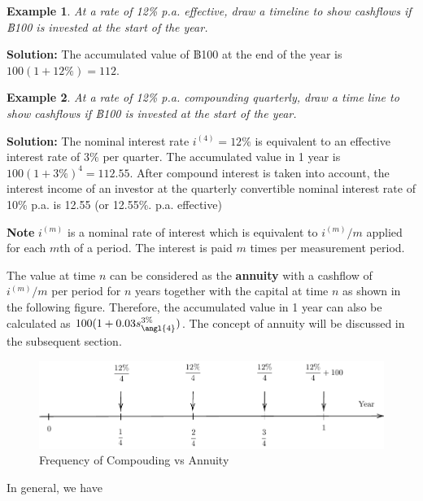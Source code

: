 \documentclass[
]{book}
\theoremstyle{definition}
\theoremstyle{definition}
\newtheorem{example}{Example}[chapter]
\theoremstyle{definition}
\theoremstyle{definition}
\theoremstyle{remark}
\begin{document}
\begin{example}
\emph{At a rate of 12\% p.a. effective, draw a timeline to show cashflows if
฿100 is invested at the start of the year.}
\end{example}

\textbf{Solution:} The accumulated value of ฿100 at the end of the year is
\(100 (1 + 12\%) = 112\).

\begin{example}
\emph{At a rate of 12\% p.a. compounding quarterly, draw a time line to show
cashflows if ฿100 is invested at the start of the year.}
\end{example}

\textbf{Solution:} The nominal interest rate \(i^{(4)} = 12\%\) is equivalent
to an effective interest rate of \(3\%\) per quarter. The accumulated
value in 1 year is \(100 (1 + 3\%)^4 = 112.55\). After compound interest
is taken into account, the interest income of an investor at the
quarterly convertible nominal interest rate of 10\% p.a. is 12.55 (or
12.55\%. p.a. effective)

\textbf{Note} \(i^{(m)}\) is a nominal rate of interest which is equivalent to \(i^{(m)}/m\) applied for
each \(m\)th of a period. The interest is paid \(m\) times per measurement period.

The value at time \(n\) can be considered as the \textbf{annuity} with a cashflow of \(i^{(m)}/m\) per period for \(n\) years together with the capital at time \(n\) as shown in the following figure.
Therefore, the accumulated value in 1 year can also be calculated as \(100( 1 + 0.03 s_{\angl{4}}^{3\%})\). The concept of annuity will be discussed in the subsequent section.

\begin{figure}

{\centering \includegraphics{SCMA266Bookdownproj_files/figure-latex/tikz-ex5-1} 

}

\caption{Frequency of Compouding vs Annuity}\label{fig:tikz-ex5}
\end{figure}

In general, we have
\end{document}
